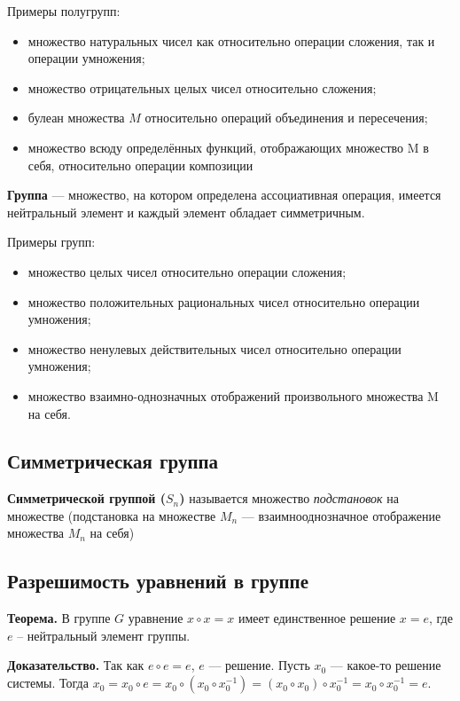 \documentclass[a4paper]{article}
\begin{document}
    Примеры полугрупп:
    \begin{itemize}
        \item множество натуральных чисел как относительно операции сложения, так и
        операции умножения;
        \item множество отрицательных целых чисел относительно сложения;
        \item булеан множества $M$ относительно операций объединения и пересечения;
        \item множество всюду определённых функций, отображающих множество M в
        себя, относительно операции композиции
    \end{itemize}

    \textbf{Группа} --- множество, на котором определена ассоциативная операция, имеется нейтральный элемент и каждый элемент обладает симметричным.

    Примеры групп:
    \begin{itemize}
        \item множество целых чисел относительно операции сложения;
        \item множество положительных рациональных чисел относительно операции
        умножения;
        \item множество ненулевых действительных чисел относительно операции
        умножения;
        \item множество взаимно-однозначных отображений произвольного множества M на себя.
    \end{itemize}

    \subsection*{Симметрическая группа}
    \textbf{Симметрической группой ($S_n$)} называется множество \textit{подстановок} на множестве (подстановка на множестве $M_n$ --- взаимнооднозначное отображение множества $M_n$ на себя)

    \subsection*{Разрешимость уравнений в группе
    }
    \begin{htheorem}
        \textbf{Теорема.}  В группе  $G$ уравнение $x \circ x = x$ имеет
        единственное решение $x = e$, где $e$ – нейтральный элемент группы.
    \end{htheorem}

    \begin{hproof}
        \textbf{Доказательство.} Так как $e \circ e = e$, $e$ --- решение. Пусть $x_0$ --- какое-то решение системы. Тогда $x_0 = x_0 \circ e = x_0 \circ (x_0 \circ x_0^{-1}) = (x_0 \circ x_0) \circ x_0^{-1} = x_0 \circ x_0^{-1} = e$.
    \end{hproof}
\end{document}
